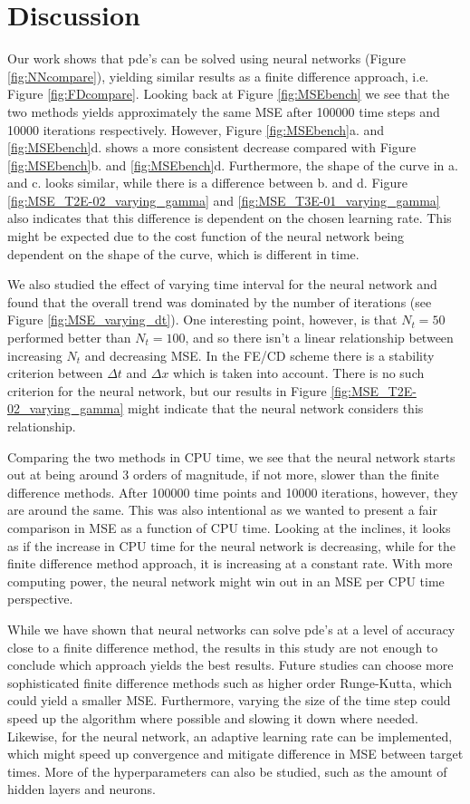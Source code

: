 \section{Discussion}
\label{sec:discussion}

Our work shows that pde's can be solved using neural networks (Figure \ref{fig:NNcompare}), yielding similar results as a finite difference approach, i.e. Figure \ref{fig:FDcompare}. Looking back at Figure \ref{fig:MSEbench} we see that the two methods yields approximately the same MSE after 100000 time steps and 10000 iterations respectively. However, Figure \ref{fig:MSEbench}a. and \ref{fig:MSEbench}d. shows a more consistent decrease compared with Figure \ref{fig:MSEbench}b. and \ref{fig:MSEbench}d. Furthermore, the shape of the curve in a. and c. looks similar, while there is a difference between b. and d. Figure \ref{fig:MSE_T2E-02_varying_gamma} and \ref{fig:MSE_T3E-01_varying_gamma} also indicates that this difference is dependent on the chosen learning rate. This might be expected due to the cost function of the neural network being dependent on the shape of the curve, which is different in time.

We also studied the effect of varying time interval for the neural network and found that the overall trend was dominated by the number of iterations (see Figure \ref{fig:MSE_varying_dt}). One interesting point, however, is that $N_t=50$ performed better than $N_t=100$, and so there isn't a linear relationship between increasing $N_t$ and decreasing MSE. In the FE/CD scheme there is a stability criterion between $\Delta t$ and $\Delta x$ which is taken into account. There is no such criterion for the neural network, but our results in Figure \ref{fig:MSE_T2E-02_varying_gamma} might indicate that the neural network considers this relationship.

Comparing the two methods in CPU time, we see that the neural network starts out at being around 3 orders of magnitude, if not more, slower than the finite difference methods. After 100000 time points and 10000 iterations, however, they are around the same. This was also intentional as we wanted to present a fair comparison in MSE as a function of CPU time. Looking at the inclines, it looks as if the increase in CPU time for the neural network is decreasing, while for the finite difference method approach, it is increasing at a constant rate. With more computing power, the neural network might win out in an MSE per CPU time perspective.

While we have shown that neural networks can solve pde's at a level of accuracy close to a finite difference method, the results in this study are not enough to conclude which approach yields the best results. Future studies can choose more sophisticated finite difference methods such as higher order Runge-Kutta, which could yield a smaller MSE. Furthermore, varying the size of the time step could speed up the algorithm where possible and slowing it down where needed. Likewise, for the neural network, an adaptive learning rate can be implemented, which might speed up convergence and mitigate difference in MSE between target times. More of the hyperparameters can also be studied, such as the amount of hidden layers and neurons.

